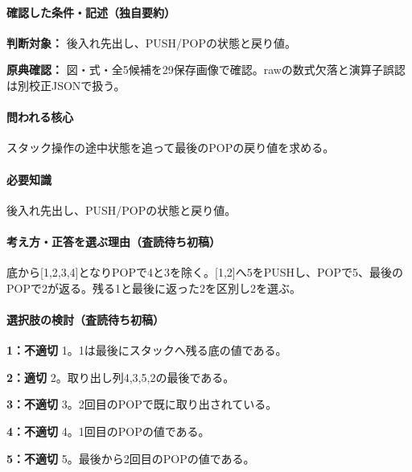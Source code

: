 \paragraph{確認した条件・記述（独自要約）}\mbox{}\par

\noindent\textbf{判断対象：} 後入れ先出し、PUSH/POPの状態と戻り値。\par

\noindent\textbf{原典確認：} 図・式・全5候補を29保存画像で確認。rawの数式欠落と演算子誤認は別校正JSONで扱う。\par

\paragraph{問われる核心} スタック操作の途中状態を追って最後のPOPの戻り値を求める。

\paragraph{必要知識} 後入れ先出し、PUSH/POPの状態と戻り値。

\paragraph{考え方・正答を選ぶ理由（査読待ち初稿）} 底から[1,2,3,4]となりPOPで4と3を除く。[1,2]へ5をPUSHし、POPで5、最後のPOPで2が返る。残る1と最後に返った2を区別し2を選ぶ。

\paragraph{選択肢の検討（査読待ち初稿）}\mbox{}\par

\noindent\textbf{1：不適切} 1。1は最後にスタックへ残る底の値である。\par

\noindent\textbf{2：適切} 2。取り出し列4,3,5,2の最後である。\par

\noindent\textbf{3：不適切} 3。2回目のPOPで既に取り出されている。\par

\noindent\textbf{4：不適切} 4。1回目のPOPの値である。\par

\noindent\textbf{5：不適切} 5。最後から2回目のPOPの値である。\par

